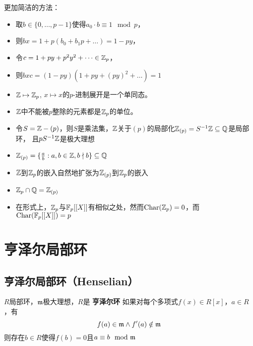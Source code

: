 \documentclass[11pt]{article}
\DeclareMathOperator{\Char}{Char}
\begin{document}
更加简洁的方法：
\begin{itemize}
\item 取\(b\in\{0,\dots,p-1\}\)使得\(a_0\cdot b\equiv 1\mod p\)，
\item 则\(bx=1+p(b_0+b_1p+\dots)=1-py\)，
\item 令\(c=1+py+p^2y^2+\dots\in\mathbb{Z}_p\)，
\item 则\(bxc=(1-py)(1+py+(py)^2+\dots)=1\)
\end{itemize}

\begin{remark}
\begin{itemize}
\item \(\mathbb{Z}\mapsto\mathbb{Z}_p\), \(x\mapsto x\)的\(p\)-进制展开是一个单同态。
\item \(\mathbb{Z}\)中不能被\(p\)整除的元素都是\(\mathbb{Z}_p\)的单位。
\item 令\(S=\mathbb{Z}-(p)\)，则\(S\)是乘法集，\(\mathbb{Z}\)关于\((p)\)的局部化\(\mathbb{Z}_{(p)}=S^{-1}\mathbb{Z}\subseteq\mathbb{Q}\)是局部环，
且\(pS^{-1}\mathbb{Z}\)是极大理想
\item \(\mathbb{Z}_{(p)}=\{\frac{a}{b}:a,b\in\mathbb{Z},b\nmid b\}\subseteq\mathbb{Q}\)
\item \(\mathbb{Z}\)到\(\mathbb{Z}_p\)的嵌入自然地扩张为\(\mathbb{Z}_{(p)}\)到\(\mathbb{Z}_p\)的嵌入
\begin{center}\end{center}
\item \(\mathbb{Z}_p\cap\mathbb{Q}=\mathbb{Z}_{(p)}\)
\item 在形式上，\(\mathbb{Z}_p\)与\(\mathbb{F}_p[[X]]\)有相似之处，然而\(\Char(\Z_p)=0\)，而\(\Char(\F_p[[X]])=p\)
\end{itemize}
\end{remark}
\section{亨泽尔局部环}
\label{sec:org08e8c15}
\subsection{亨泽尔局部环（Henselian）}
\label{sec:org9787992}
\begin{definition}[]
\(R\)局部环，\(\mathfrak{m}\)极大理想，\(R\)是 \textbf{亨泽尔环} 如果对每个多项式\(f(x)\in R[x]\)，\(a\in R\)，有
\begin{equation*}
f(a)\in\mathfrak{m}\wedge f'(a)\notin\mathfrak{m}
\end{equation*}
则存在\(b\in R\)使得\(f(b)=0\)且\(a\equiv b\mod{\mathfrak{m}}\)
\end{definition}
\end{document}
